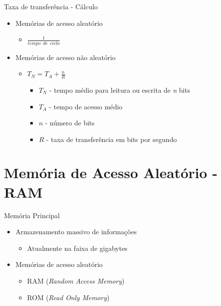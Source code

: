 \documentclass[aspectratio=169,
				xcolor=table]{beamer}
\begin{document}
	\begin{frame}{Taxa de transferência - Cálculo}
		\begin{itemize}
			\item Memórias de acesso aleatório
			\begin{itemize}
				\item $\frac{1}{tempo \enspace de \enspace ciclo}$
			\end{itemize}
			\vspace{1em}
			\item Memórias de acesso não aleatório
			\begin{itemize}
				\item $T_N = T_A +\frac{n}{R}$
				\begin{itemize}
				\item $T_N$ - tempo médio para leitura ou escrita de \textit{n} bits
				\item $T_A$ - tempo de acesso médio
				\item $n$ - número de bits
				\item $R$ - taxa de transferência em bits por segundo				
				\end{itemize}
			\end{itemize}
		\end{itemize}
	\end{frame}		
	
	\section{Memória de Acesso Aleatório - RAM}
	\begin{frame}{Memória Principal}
		\begin{itemize}
			\item Armazenamento massivo de informações
			\begin{itemize}
				\item Atualmente na faixa de gigabytes
			\end{itemize}
			\vspace{1em}
			\item Memórias de acesso aleatório
			\begin{itemize}
				\item RAM (\textit{Random Access Memory})
				\item ROM (\textit{Read Only Memory})

			\end{itemize}
		\end{itemize}
	\end{frame}
	
\end{document}
